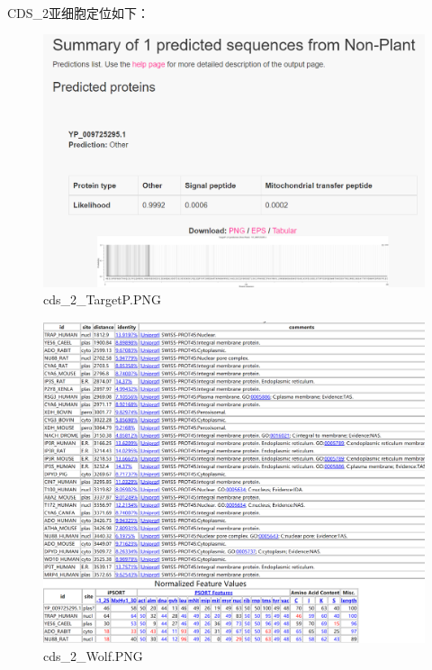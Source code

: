 \documentclass[supercite]{HustGraduPaper}
\begin{document}
	\paragraph{}\label{subpara:subpara}CDS\_2亚细胞定位如下：
	\begin{figure}[H]
		\centering
		\includegraphics[width=1\textwidth]{./material/practice2/cds_2/TargetP.png}
		\caption{cds\_2\_TargetP.PNG}
	\end{figure}
	\begin{figure}[H]
		\centering
		\includegraphics[width=1\textwidth]{./material/practice2/cds_2/wolf.png}
		\caption{cds\_2\_Wolf.PNG}
	\end{figure}
\end{document}
